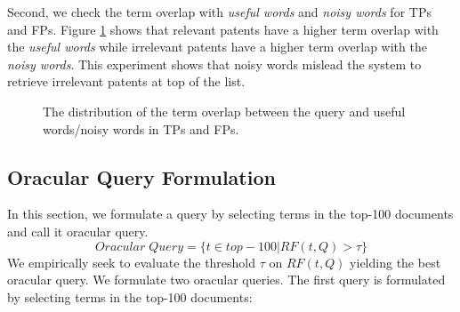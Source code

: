 Second, we check the term overlap with \textit{useful words} and \textit{noisy words} for TPs and FPs. Figure \ref{fig:usefulnoisy} shows that relevant patents have a higher term overlap with the \textit{useful words} while irrelevant patents have a higher term overlap with the \textit{noisy words}. This experiment shows that noisy words mislead the system to retrieve irrelevant patents at top of the list.
\begin{figure}[t!]
\begin{centering}
 \hspace*{1.5cm}  
\par\end{centering} 
\protect\caption{The distribution of the term overlap between the query and useful words/noisy words in TPs and FPs.}
\label{fig:usefulnoisy}
\end{figure}
\newpage
\subsection{Oracular Query Formulation}
In this section, we formulate a query by selecting terms in the top-100 documents and call it oracular query. 
\begin{equation}
Oracular \; Query = \{t \in top-100|RF(t, Q)>\tau\}   
 \label{eq:score}
\end{equation}
We empirically seek to evaluate the threshold $\tau$ on $RF(t,Q)$ yielding the best oracular query.
We formulate two oracular queries. The first query is formulated by selecting terms in the top-100 documents:

